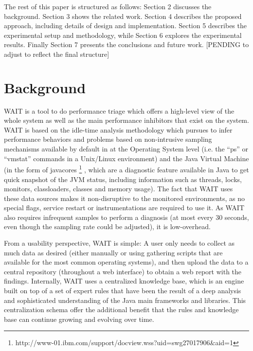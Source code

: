 \documentclass[runningheads,a4paper]{llncs}
\begin{document}
The rest of this paper is structured as follows: Section 2 discusses the
background. Section 3 shows the related work. Section 4 describes the proposed
approach, including details of design and implementation. Section 5 describes
the experimental setup and methodology, while Section 6 explores the
experimental results. Finally Section 7 presents the conclusions and future
work. [PENDING to adjust to reflect the final structure]



\section{Background}

WAIT is a tool to do performance triage which offers a high-level view of
the whole system as well as the main performance inhibitors that exist on the
system. WAIT is based on the idle-time analysis methodology \cite{Altman2010}
which pursues to infer performance behaviors and problems based on non-intrusive sampling mechanisms
available by default in at the Operating System level (i.e. the ``ps'' or
``vmstat'' commands in a Unix/Linux environment) and the Java Virtual Machine
(in the form of javacores
\footnote{http://www-01.ibm.com/support/docview.wss?uid=swg27017906\&aid=1}
, which are a diagnostic feature available in Java to get quick snapshot of the
JVM status, including information such as threads, locks, monitors,
classloaders, classes and memory usage). The fact that WAIT uses these data
sources makes it non-disruptive to the monitored environments, as no special flags, 
service restart or instrumentations are required to use it. As WAIT also
requires infrequent samples to perform a diagnosis (at most every 30 seconds,
even though the sampling rate could be adjusted), it is low-overhead.

From a usability perspective, WAIT is simple: A user only needs to
collect as much data as desired (either manually or using gathering scripts
that are available for the most common operating systems), and then upload the
data to a central repository (throughout a web interface) to obtain a web 
report with the findings. Internally, WAIT uses a centralized knowledge base,
which is an engine built on top of a set of expert rules that have been the result of a 
deep analysis and sophisticated understanding of the Java main frameworks and
libraries. This centralization schema offer the additional benefit that
the rules and knowledge base can continue growing and evolving over time.
\end{document}
